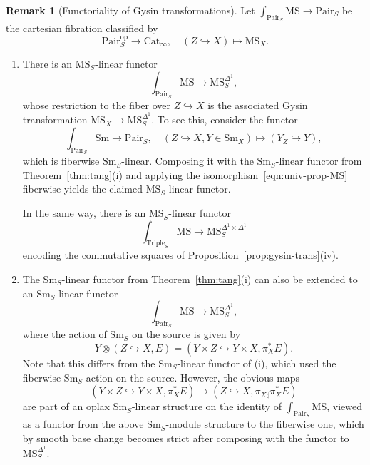 \documentclass{amsart}
\numberwithin{equation}{section}
\theoremstyle{plain}
\theoremstyle{definition}
\newtheorem{remark}[equation]{Remark}
\let\into=\hookrightarrow
\let\cat=\mathrm
\def\Sm{{\cat{S}\mathrm{m}}}
\def\op{\mathrm{op}}
\def\Pair{\mathrm{Pair}}
\def\MS{\mathrm{MS}}
\def\Cat{\mathrm{C}\mathrm{at}{}}
\begin{document}
\begin{remark}[Functoriality of Gysin transformations]
	\label{rmk:func-gysin}
	Let $\int_{\Pair_S}\MS\to \Pair_S$ be the cartesian fibration classified by 
	\[
	\Pair_S^\op\to \Cat_\infty,\quad (Z\into X)\mapsto \MS_X.
	\]
\begin{enumerate}
	\item There is an $\MS_S$-linear functor
	\begin{equation*}\label{eqn:Gys-natural}
	\int_{\Pair_S}\MS \to \MS_S^{\Delta^1},
	\end{equation*}
	whose restriction to the fiber over $Z\into X$ is the associated Gysin transformation $\MS_X\to \MS_S^{\Delta^1}$.
	To see this, consider the functor
	\[
	\int_{\Pair_S}\Sm \to \Pair_S,\quad (Z\into X,Y\in \Sm_X)\mapsto (Y_Z\into Y),
	\]
	which is fiberwise $\Sm_S$-linear. Composing it with the $\Sm_S$-linear functor from Theorem~\ref{thm:tang}(i) and applying the isomorphism~\eqref{eqn:univ-prop-MS} fiberwise yields the claimed $\MS_S$-linear functor.
	
	In the same way, there is an $\MS_S$-linear functor
	\[
	\int_{\mathrm{Triple}_S}\MS \to \MS_S^{\Delta^1\times\Delta^1}
	\]
	encoding the commutative squares of Proposition~\ref{prop:gysin-trans}(iv).
	\item The $\Sm_S$-linear functor from Theorem~\ref{thm:tang}(i) can also be extended to an $\Sm_S$-linear functor
	\[
	\int_{\Pair_S}\MS \to \MS_S^{\Delta^1},
	\]
	where the action of $\Sm_S$ on the source is given by
	\[
	Y \otimes (Z\into X, E) = (Y\times Z\into Y\times X, \pi_X^*E).
	\]
	Note that this differs from the $\Sm_S$-linear functor of (i), which used the fiberwise $\Sm_S$-action on the source.
	However, the obvious maps
	\[
	(Y\times Z\into Y\times X, \pi_X^*E) \to (Z\into X, \pi_{X\sharp}\pi_X^*E)
	\]
	are part of an oplax $\Sm_S$-linear structure on the identity of $\int_{\Pair_S}\MS$, viewed as a functor from the above $\Sm_S$-module structure to the fiberwise one, which by smooth base change becomes strict after composing with the functor to $\MS_S^{\Delta^1}$.
\end{enumerate}
\end{remark}
\end{document}
